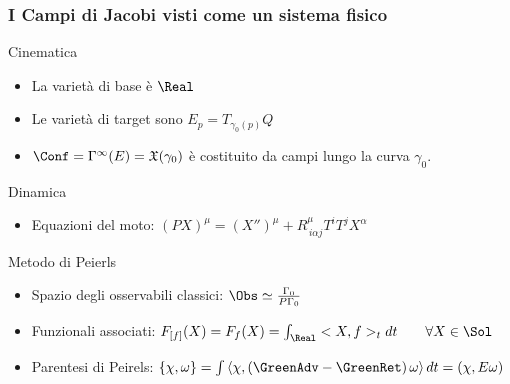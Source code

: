 \documentclass[8pt,handout]{beamer}
\begin{document}
	\begin{frame}
		\frametitle{I Campi di Jacobi visti come un sistema fisico}
			\begin{block}{Cinematica}
					\begin{itemize}
						\item La varietà di base è $\Real$ 
				\item Le varietà di target  sono $E_p = T_{\gamma_0(p)}Q$
				\item $\Conf = \Gamma^\infty(E) = \mathfrak{X}(\gamma_0)$ è costituito da campi lungo la curva $\gamma_0$.
					\end{itemize}
			\end{block}
			\begin{block}{Dinamica}

				\begin{itemize}
					\item Equazioni del moto: $ \left( P X \right)^\mu = (X'')^\mu + R^\mu_{\, i \alpha j } T^i T^j X^\alpha$ 
				\end{itemize}

			\end{block}
	

			\begin{block}{Metodo di Peierls}
				\begin{itemize}
					\item Spazio degli osservabili classici:  $	\Obs \simeq \frac{\Gamma_0}{P \Gamma_0}$
					\item Funzionali associati: $ F_{[f]}(X) = F_f (X)= \int_\Real <X, f>_t dt \qquad \forall X \in \Sol $
					\item Parentesi di Peirels: 
						$ \left\lbrace\chi , \omega \right\rbrace = \int \left\langle\chi, \left(\GreenAdv - \GreenRet \right)\omega \right\rangle dt  
							= (\chi, E \omega)$
				\end{itemize}
			\end{block}
	\end{frame}
	
\end{document}
